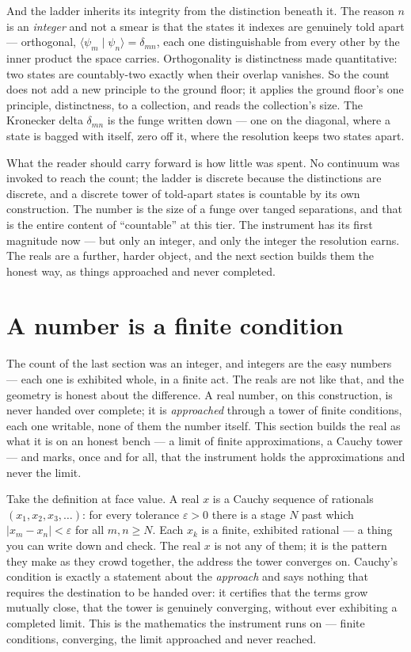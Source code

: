 And the ladder inherits its integrity from the distinction beneath it. The reason $n$ is an \emph{integer} and not a smear is
that the states it indexes are genuinely told apart --- orthogonal, $\langle \psi_m \mid \psi_n \rangle = \delta_{mn}$, each
one distinguishable from every other by the inner product the space carries. Orthogonality is distinctness made quantitative:
two states are countably-two exactly when their overlap vanishes. So the count does not add a new principle to the ground
floor; it applies the ground floor's one principle, distinctness, to a collection, and reads the collection's size. The
Kronecker delta $\delta_{mn}$ is the funge written down --- one on the diagonal, where a state is bagged with itself, zero
off it, where the resolution keeps two states apart.

What the reader should carry forward is how little was spent. No continuum was invoked to reach the count; the ladder is
discrete because the distinctions are discrete, and a discrete tower of told-apart states is countable by its own
construction. The number is the size of a funge over tanged separations, and that is the entire content of ``countable'' at
this tier. The instrument has its first magnitude now --- but only an integer, and only the integer the resolution earns.
The reals are a further, harder object, and the next section builds them the honest way, as things approached and never
completed.

\section{A number is a finite condition}

The count of the last section was an integer, and integers are the easy numbers --- each one is exhibited whole, in a finite
act. The reals are not like that, and the geometry is honest about the difference. A real number, on this construction, is
never handed over complete; it is \emph{approached} through a tower of finite conditions, each one writable, none of them the
number itself. This section builds the real as what it is on an honest bench --- a limit of finite approximations, a Cauchy
tower --- and marks, once and for all, that the instrument holds the approximations and never the limit.

Take the definition at face value. A real $x$ is a Cauchy sequence of rationals $(x_1, x_2, x_3, \dots)$: for every
tolerance $\varepsilon > 0$ there is a stage $N$ past which $\lvert x_m - x_n \rvert < \varepsilon$ for all $m, n \geq N$.
Each $x_k$ is a finite, exhibited rational --- a thing you can write down and check. The real $x$ is not any of them; it is
the pattern they make as they crowd together, the address the tower converges on. Cauchy's condition is exactly a statement
about the \emph{approach} and says nothing that requires the destination to be handed over: it certifies that the terms grow
mutually close, that the tower is genuinely converging, without ever exhibiting a completed limit. This is the mathematics
the instrument runs on --- finite conditions, converging, the limit approached and never reached.

